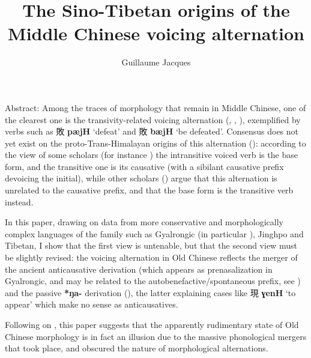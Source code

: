 \documentclass[oneside,a4paper,11pt]{article}
\newcommand{\ipa}[1]{\textbf{{\phon\mbox{#1}}}} %
\newcommand{\zh}[1]{{\cn #1}}
\newcommand{\zhc}[2]{\zh{#1} \ipa{#2}}
\begin{document}
\title{The Sino-Tibetan origins of the Middle Chinese voicing alternation}
\author{Guillaume Jacques}
\maketitle


Abstract: Among the traces of morphology that remain in Middle Chinese, one of the clearest one is the transivity-related voicing alternation (\citealt[79-80]{zhou62goucibian}, \citealt{downer73loanwords}, \citealt{sagart03prenasalized}), exemplified by verbs such as \zhc{敗}{pæjH} `defeat' and \zhc{敗}{bæjH} `be defeated'. Consensus does not yet exist on the proto-Trans-Himalayan origins of this alternation (\citealt{handel12valence}): according to the view of some scholars (for instance \citealt{mei12caus}) the intransitive voiced verb is the base form, and the transitive one is its causative (with a sibilant causative prefix devoicing the initial), while other scholars (\citealt{sagart12sprefix}) argue that this alternation is unrelated to the causative prefix, and that the base form is the transitive verb instead.

In this paper, drawing on data from more conservative and morphologically complex languages of the family such as Gyalrongic (in particular \citealt{jacques15causative, lai16caus, gong17xingtaixue}), Jinghpo and Tibetan, I show that the first view is untenable, but that the second view must be slightly revised: the voicing alternation in Old Chinese reflects the merger of the ancient anticausative derivation (which appears as prenasalization in Gyalrongic, and may be related to the autobenefactive/spontaneous prefix, see  \citealt{jacques15spontaneous}) and the passive \ipa{*ŋa-} derivation (\citealt{jacques07passif, jacques12demotion}), the latter explaining cases like \zhc{現}{ɣenH} `to appear' which make no sense as anticausatives.

Following on  \citet{jacques16ssuffixes}, this paper suggests that the apparently rudimentary state of Old Chinese morphology is in fact an illusion due to the massive phonological mergers that took place, and obscured the nature of morphological alternations.  
\end{document}
